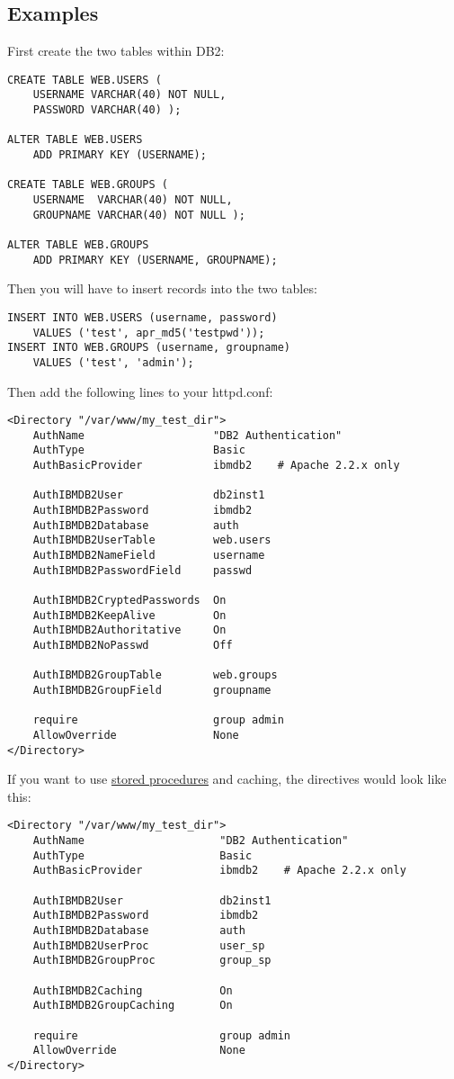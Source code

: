 \documentclass[11pt,letterpaper]{article}
\begin{document}
\subsection{Examples}
First create the two tables within DB2:
\begin{verbatim}
CREATE TABLE WEB.USERS (
    USERNAME VARCHAR(40) NOT NULL,
    PASSWORD VARCHAR(40) );

ALTER TABLE WEB.USERS
    ADD PRIMARY KEY (USERNAME);

CREATE TABLE WEB.GROUPS (
    USERNAME  VARCHAR(40) NOT NULL,
    GROUPNAME VARCHAR(40) NOT NULL );

ALTER TABLE WEB.GROUPS
    ADD PRIMARY KEY (USERNAME, GROUPNAME);
\end{verbatim}
Then you will have to insert records into the two tables:
\begin{verbatim}
INSERT INTO WEB.USERS (username, password)
    VALUES ('test', apr_md5('testpwd'));
INSERT INTO WEB.GROUPS (username, groupname) 
    VALUES ('test', 'admin');
\end{verbatim}
Then add the following lines to your httpd.conf:
\begin{verbatim}
<Directory "/var/www/my_test_dir">
    AuthName                    "DB2 Authentication"
    AuthType                    Basic
    AuthBasicProvider           ibmdb2    # Apache 2.2.x only

    AuthIBMDB2User              db2inst1
    AuthIBMDB2Password          ibmdb2
    AuthIBMDB2Database          auth
    AuthIBMDB2UserTable         web.users
    AuthIBMDB2NameField         username
    AuthIBMDB2PasswordField     passwd

    AuthIBMDB2CryptedPasswords  On
    AuthIBMDB2KeepAlive         On
    AuthIBMDB2Authoritative     On
    AuthIBMDB2NoPasswd          Off

    AuthIBMDB2GroupTable        web.groups
    AuthIBMDB2GroupField        groupname

    require                     group admin
    AllowOverride               None
</Directory>
\end{verbatim}
If you want to use \hyperlink{hsps}{stored procedures} and caching, the directives would look like this:
\begin{verbatim}
<Directory "/var/www/my_test_dir">
    AuthName                     "DB2 Authentication"
    AuthType                     Basic
    AuthBasicProvider            ibmdb2    # Apache 2.2.x only

    AuthIBMDB2User               db2inst1
    AuthIBMDB2Password           ibmdb2
    AuthIBMDB2Database           auth
    AuthIBMDB2UserProc           user_sp
    AuthIBMDB2GroupProc          group_sp

    AuthIBMDB2Caching            On
    AuthIBMDB2GroupCaching       On

    require                      group admin
    AllowOverride                None
</Directory>
\end{verbatim}
\newpage
\end{document}
